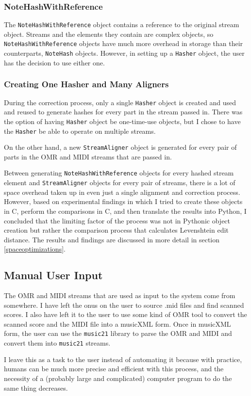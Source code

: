 \subsubsection{NoteHashWithReference}
The \texttt{NoteHashWithReference} object contains a reference to the original stream object. Streams and the elements they contain are complex objects, so \texttt{NoteHashWithReference} objects have much more overhead in storage than their counterparts, \texttt{NoteHash} objects. However, in setting up a \texttt{Hasher} object, the user has the decision to use either one.   

\subsubsection{Creating One Hasher and Many Aligners}
During the correction process, only a single \texttt{Hasher} object is created and used and reused to generate hashes for every part in the stream passed in. There was the option of having \texttt{Hasher} object be one-time-use objects, but I chose to have the \texttt{Hasher} be able to operate on multiple streams. 

On the other hand, a new \texttt{StreamAligner} object is generated for every pair of parts in the OMR and MIDI streams that are passed in. 

Between generating \texttt{NoteHashWithReference} objects for every hashed stream element and \texttt{StreamAligner} objects for every pair of streams, there is a lot of space overhead taken up in even just a single alignment and correction process. However, based on experimental findings in which I tried to create these objects in C, perform the comparisons in C, and then translate the results into Python, I concluded that the limiting factor of the process was not in Pythonic object creation but rather the comparison process that calculates Levenshtein edit distance. The results and findings are discussed in more detail in section \ref{spaceoptimizations}.


\subsection{Manual User Input}
The OMR and MIDI streams that are used as input to the system come from somewhere. I have left the onus on the user to source .mid files and find scanned scores. I also have left it to the user to use some kind of OMR tool to convert the scanned score and the MIDI file into a musicXML form. Once in musicXML form, the user can use the \texttt{music21} library to parse the OMR and MIDI and convert them into \texttt{music21} streams. 

I leave this as a task to the user instead of automating it because with practice, humans can be much more precise and efficient with this process, and the necessity of a (probably large and complicated) computer program to do the same thing decreases. 
